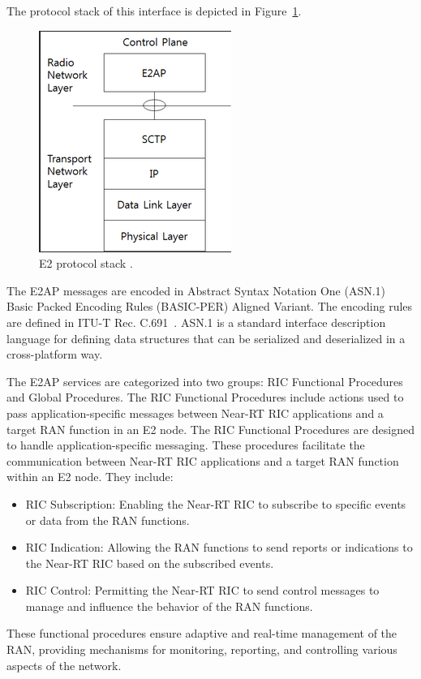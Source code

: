The protocol stack of this interface is depicted in Figure~\ref{fig:E2_stack}.

\begin{figure}[H]
    \centering
    \includegraphics[width=0.3\linewidth]{figures/E2_stack}
    \caption[E2 protocol stack]{E2 protocol stack \cite{E2GAP}.}
    \label{fig:E2_stack}
\end{figure}

The E2AP messages are encoded in Abstract Syntax Notation One (ASN.1) Basic Packed Encoding Rules (BASIC-PER) Aligned Variant.
The encoding rules are defined in ITU-T Rec. C.691~\cite{ITU_T_C691}.
ASN.1 is a standard interface description language for defining data structures that can be serialized and deserialized in a cross-platform way.

The E2AP services are categorized into two groups: RIC Functional Procedures and Global Procedures.
The RIC Functional Procedures include actions used to pass application-specific messages between Near-RT RIC applications and a target RAN function in an E2 node.
The RIC Functional Procedures are designed to handle application-specific messaging.
These procedures facilitate the communication between Near-RT RIC applications and a target RAN function within an E2 node.
They include:

\begin{itemize}
\item RIC Subscription: Enabling the Near-RT RIC to subscribe to specific events or data from the RAN functions.
\item RIC Indication: Allowing the RAN functions to send reports or indications to the Near-RT RIC based on the subscribed events.
\item RIC Control: Permitting the Near-RT RIC to send control messages to manage and influence the behavior of the RAN functions.
\end{itemize}
These functional procedures ensure adaptive and real-time management of the RAN, providing mechanisms for monitoring, reporting, and controlling various aspects of the network.

